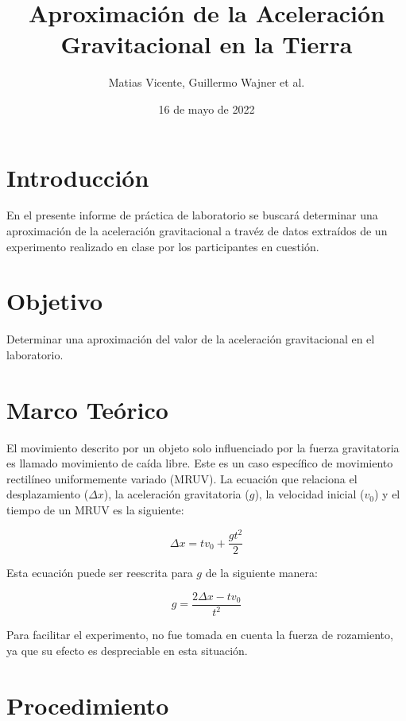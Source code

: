 \documentclass{article}
\title{Aproximación de la Aceleración Gravitacional en la Tierra}
\author{Matias Vicente, Guillermo Wajner et al.}
\date{16 de mayo de 2022}
\begin{document}
\maketitle

\section{Introducci\'{o}n}

En el presente informe de pr\'{a}ctica de laboratorio se buscar\'{a} determinar una aproximación de la aceleración gravitacional a trav\'{e}z de datos extra\'{i}dos de un experimento realizado en clase por los participantes en cuesti\'{o}n.

\section{Objetivo}

Determinar una aproximación del valor de la aceleraci\'{o}n gravitacional en el laboratorio. 

\section{Marco Te\'{o}rico}

El movimiento descrito por un objeto solo influenciado por la fuerza gravitatoria es llamado movimiento de ca\'{i}da libre. Este es un caso espec\'{i}fico de movimiento rectil\'{i}neo uniformemente variado (MRUV). La ecuaci\'{o}n que relaciona el desplazamiento ($\Delta x$), la aceleraci\'{o}n gravitatoria ($g$), la velocidad inicial ($v_0$) y el tiempo de un MRUV es la siguiente: 

\begin{equation}
\Delta x=tv_0+\frac{gt^2}{2}
\end{equation}

Esta ecuaci\'{o}n puede ser reescrita para $g$ de la siguiente manera:

\begin{equation}
\label{eqn:g}
g=\frac{2\Delta x-tv_0}{t^2}
\end{equation}

Para facilitar el experimento, no fue tomada en cuenta la fuerza de rozamiento, ya que su efecto es despreciable en esta situaci\'{o}n.

\section{Procedimiento}
\end{document}
